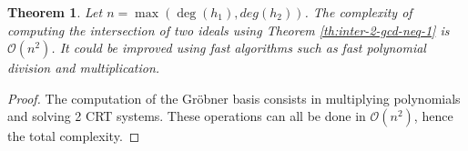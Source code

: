 \documentclass{article}
\newtheorem{theorem}{Theorem}[section]
\begin{document}
\begin{flushleft}

\begin{theorem} 
    Let $n = \max(\deg(h_{1}), deg(h_{2}))$. The complexity of computing the intersection of two ideals using Theorem \ref{th:inter-2-gcd-neq-1} is $\mathcal{O}(n^2)$. It could be improved using fast algorithms such as fast polynomial division and multiplication.
\end{theorem}

\begin{proof}
    The computation of the Gröbner basis consists in multiplying polynomials and solving 2 CRT systems. These operations can all be done in $\mathcal{O}(n^2)$, hence the total complexity.
\end{proof}



\end{flushleft}
\end{document}
